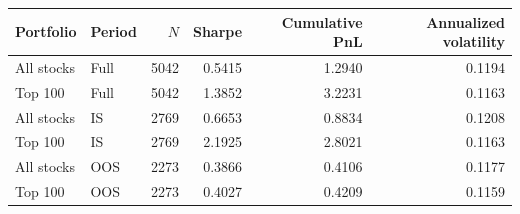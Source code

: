 \begin{tabular}{llrrrr}
\toprule
Portfolio & Period & $N$ & Sharpe & Cumulative PnL & Annualized volatility \\
\midrule
All stocks & Full & 5042 & 0.5415 & 1.2940 & 0.1194 \\
Top 100 & Full & 5042 & 1.3852 & 3.2231 & 0.1163 \\
All stocks & IS & 2769 & 0.6653 & 0.8834 & 0.1208 \\
Top 100 & IS & 2769 & 2.1925 & 2.8021 & 0.1163 \\
All stocks & OOS & 2273 & 0.3866 & 0.4106 & 0.1177 \\
Top 100 & OOS & 2273 & 0.4027 & 0.4209 & 0.1159 \\
\bottomrule
\end{tabular}
